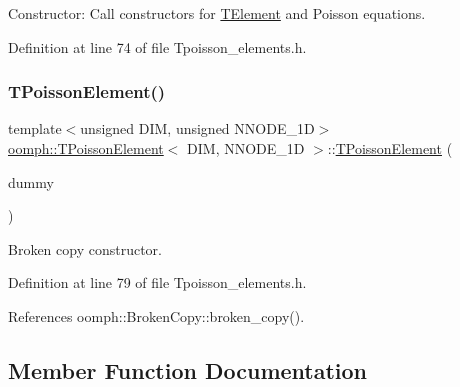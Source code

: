 Constructor\+: Call constructors for \hyperlink{classoomph_1_1TElement}{T\+Element} and Poisson equations. 



Definition at line 74 of file Tpoisson\+\_\+elements.\+h.

\mbox{\label{classoomph_1_1TPoissonElement_a1af1fe9dc7fbd290654ecc8a0f2b211b}} 
\subsubsection{\texorpdfstring{T\+Poisson\+Element()}{TPoissonElement()}\hspace{0.1cm}{\footnotesize\ttfamily [2/2]}}
{\footnotesize\ttfamily template$<$unsigned D\+IM, unsigned N\+N\+O\+D\+E\+\_\+1D$>$ \\
\hyperlink{classoomph_1_1TPoissonElement}{oomph\+::\+T\+Poisson\+Element}$<$ D\+IM, N\+N\+O\+D\+E\+\_\+1D $>$\+::\hyperlink{classoomph_1_1TPoissonElement}{T\+Poisson\+Element} (\begin{DoxyParamCaption}\item[{const \hyperlink{classoomph_1_1TPoissonElement}{T\+Poisson\+Element}$<$ D\+IM, N\+N\+O\+D\+E\+\_\+1D $>$ \&}]{dummy }\end{DoxyParamCaption})\hspace{0.3cm}{\ttfamily [inline]}}



Broken copy constructor. 



Definition at line 79 of file Tpoisson\+\_\+elements.\+h.



References oomph\+::\+Broken\+Copy\+::broken\+\_\+copy().



\subsection{Member Function Documentation}
\mbox{\label{classoomph_1_1TPoissonElement_a957fae1b510200732d7da2594d1a69c2}} 
